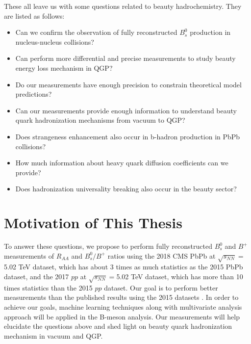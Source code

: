 These all leave us with some questions related to beauty hadrochemistry. They are listed as follows:

\begin{itemize}
\item Can we confirm the observation of fully reconstructed $B^0_s$ production in nucleus-nucleus collisions?
\item Can perform more differential and precise measurements to study beauty energy loss mechanism in QGP?
\item Do our measurements have enough precision to constrain theoretical model predictions?
\item Can our measurements provide enough information to understand beauty quark hadronization mechanisms from vacuum to QGP?
\item Does strangeness enhancement also occur in b-hadron production in PbPb collisions?
\item How much information about heavy quark diffusion coefficients can we provide?
\item Does hadronization universality breaking also occur in the beauty sector?
\end{itemize}







\section{Motivation of This Thesis}

To answer these questions, we propose to perform fully reconstructed $B^0_s$ and $B^+$ measurements of $R_{AA}$ and $B^0_s/B^+$ ratios using the 2018 CMS PbPb at $\sqrt{s_{NN}} = $5.02 TeV dataset, which has about 3 times as much statistics as the 2015 PbPb dataset, and the 2017 $pp$ at $\sqrt{s_{NN}} = $5.02 TeV dataset, which has more than 10 times statistics than the 2015 $pp$ dataset. Our goal is to perform better measurements than the published results using the 2015 datasets \cite{CMSBsBP2015}. In order to achieve our goals, machine learning techniques along with multivariate analysis approach will be applied in the B-meson analysis. Our measurements will help elucidate the questions above and shed light on beauty quark hadronization mechanism in vacuum and QGP. 


